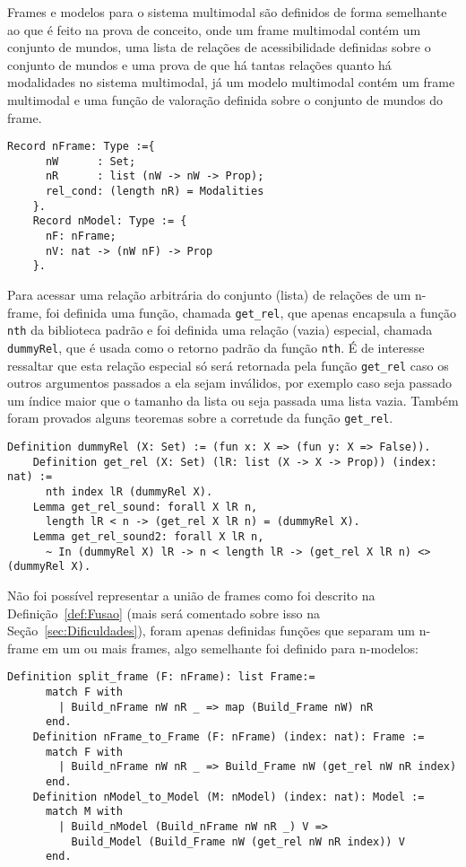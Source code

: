       Frames e modelos para o sistema multimodal são definidos de forma semelhante ao que é feito na prova de conceito, onde um frame multimodal contém um conjunto de mundos,
      uma lista de relações de acessibilidade definidas sobre o conjunto de mundos e uma prova de que há tantas relações quanto há modalidades no sistema multimodal, já um modelo multimodal
      contém um frame multimodal e uma função de valoração definida sobre o conjunto de mundos do frame.
      \begin{lstlisting}[language=coq]
    Record nFrame: Type :={
      nW      : Set;
      nR      : list (nW -> nW -> Prop);
      rel_cond: (length nR) = Modalities
    }.
    Record nModel: Type := {
      nF: nFrame;
      nV: nat -> (nW nF) -> Prop
    }.
      \end{lstlisting}

      Para acessar uma relação arbitrária do conjunto (lista) de relações de um n-frame, foi definida uma função, chamada \texttt{get\_rel}, que apenas encapsula a função
      \texttt{nth} da biblioteca padrão e foi definida uma relação (vazia) especial, chamada \texttt{dummyRel}, que é usada como o retorno padrão da função \texttt{nth}.
      É de interesse ressaltar que esta relação especial só será retornada pela função \texttt{get\_rel} caso os outros argumentos passados a ela sejam inválidos,
      por exemplo caso seja passado um índice maior que o tamanho da lista ou seja passada uma lista vazia. Também foram provados alguns teoremas sobre a corretude
      da função \texttt{get\_rel}.
      \begin{lstlisting}[language=coq]
    Definition dummyRel (X: Set) := (fun x: X => (fun y: X => False)).
    Definition get_rel (X: Set) (lR: list (X -> X -> Prop)) (index: nat) :=
      nth index lR (dummyRel X).
    Lemma get_rel_sound: forall X lR n,
      length lR < n -> (get_rel X lR n) = (dummyRel X).
    Lemma get_rel_sound2: forall X lR n,
      ~ In (dummyRel X) lR -> n < length lR -> (get_rel X lR n) <> (dummyRel X).
      \end{lstlisting}

      Não foi possível representar a união de frames como foi descrito na Definição~\ref{def:Fusao} (mais será comentado sobre isso na Seção~\ref{sec:Dificuldades}),
      foram apenas definidas funções que separam um n-frame em um ou mais frames, algo semelhante foi definido para n-modelos:
      \begin{lstlisting}[language=coq]
    Definition split_frame (F: nFrame): list Frame:=
      match F with
        | Build_nFrame nW nR _ => map (Build_Frame nW) nR
      end.
    Definition nFrame_to_Frame (F: nFrame) (index: nat): Frame :=
      match F with
        | Build_nFrame nW nR _ => Build_Frame nW (get_rel nW nR index)
      end.
    Definition nModel_to_Model (M: nModel) (index: nat): Model :=
      match M with
        | Build_nModel (Build_nFrame nW nR _) V =>
          Build_Model (Build_Frame nW (get_rel nW nR index)) V
      end.
      \end{lstlisting}

